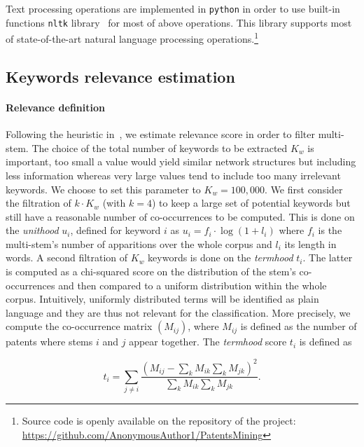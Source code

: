 \documentclass[10pt,A4,draft]{article}
\begin{document}
Text processing operations are implemented in \texttt{python} in order to use built-in functions \texttt{nltk} library~\cite{nltk} for most of above operations. This library supports most of state-of-the-art natural language processing operations.\footnote{Source code is openly available on the repository of the project: \url{https://github.com/AnonymousAuthor1/PatentsMining} 
}

\subsection{Keywords relevance estimation}
\label{keywords_est}
\paragraph{Relevance definition}

Following the heuristic in~\cite{chavalarias2013phylomemetic}, we estimate relevance score in order to filter multi-stem. The choice of the total number of keywords to be extracted $K_w$ is important, too small a value would yield similar network structures but including less information whereas very large values tend to include too many irrelevant keywords. We choose to set this parameter to $K_w = 100,000$. We first consider the filtration of $k\cdot K_w$ (with $k=4$) to keep a large set of potential keywords but still have a reasonable number of co-occurrences to be computed. This is done on the \emph{unithood} $u_i$, defined for keyword $i$ as $u_i = f_i\cdot \log{(1 + l_i)}$ where $f_i$ is the multi-stem's number of apparitions over the whole corpus and $l_i$ its length in words. A second filtration of $K_w$ keywords is done on the \emph{termhood} $t_i$. The latter is computed as a chi-squared score on the distribution of the stem's co-occurrences and then compared to a uniform distribution within the whole corpus. Intuitively, uniformly distributed terms will be identified as plain language and they are thus not relevant for the classification. More precisely, we compute the co-occurrence matrix $(M_{ij})$, where $M_{ij}$ is defined as the number of patents where stems $i$ and $j$ appear together. The \emph{termhood} score $t_i$ is defined as

\[
t_i = \sum_{j\neq i}\frac{\left( M_{ij} - \sum_{k}M_{ik} \sum_{k} M_{jk}\right)^2}{\sum_{k}M_{ik} \sum_{k} M_{jk}}.
\]
\end{document}
